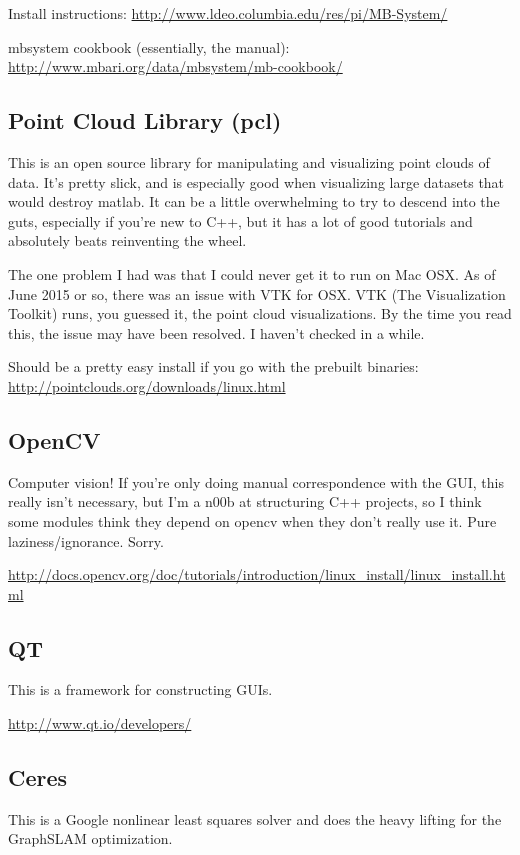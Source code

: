 \documentclass[12pt]{amsart}
\begin{document}
Install instructions: \url{http://www.ldeo.columbia.edu/res/pi/MB-System/}

mbsystem cookbook (essentially, the manual): \url{http://www.mbari.org/data/mbsystem/mb-cookbook/}

\subsection*{Point Cloud Library (pcl)}
This is an open source library for manipulating and visualizing point clouds of data. It's pretty slick, and is especially good when visualizing large datasets that would destroy matlab. It can be a little overwhelming to try to descend into the guts, especially if you're new to C++, but it has a lot of good tutorials and absolutely beats reinventing the wheel.

The one problem I had was that I could never get it to run on Mac OSX. As of June 2015 or so, there was an issue with VTK for OSX. VTK (The Visualization Toolkit) runs, you guessed it, the point cloud visualizations. By the time you read this, the issue may have been resolved. I haven't checked in a while.

Should be a pretty easy install if you go with the prebuilt binaries: 
\url{http://pointclouds.org/downloads/linux.html}

\subsection*{OpenCV}
Computer vision! If you're only doing manual correspondence with the GUI, this really isn't necessary, but I'm a n00b at structuring C++ projects, so I think some modules think they depend on opencv when they don't really use it. Pure laziness/ignorance. Sorry.

\url{http://docs.opencv.org/doc/tutorials/introduction/linux_install/linux_install.html}

\subsection*{QT}

This is a framework for constructing GUIs. 

\url{http://www.qt.io/developers/}

\subsection*{Ceres}
This is a Google nonlinear least squares solver and does the heavy lifting for the GraphSLAM optimization.
\end{document}
